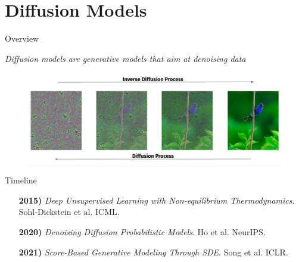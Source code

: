 \documentclass[aspectratio=169, 9pt]{beamer}
\theoremstyle{definition}
\begin{document}
\section{Diffusion Models}
\begin{frame}{Overview}
  \begin{center}
    \it
    Diffusion models are generative models that aim at denoising data
  \end{center}
  \begin{figure}[h!]
    \centering
    \includegraphics[scale=0.2]{./pic/diffusion_intro.png}
  \end{figure}
\end{frame}
\begin{frame}{Timeline}
\begin{enumerate}
  \item[\bf 2015)] \textit{Deep Unsupervised Learning with Non-equilibrium
  Thermodynamics}. Sohl-Dickstein et al. ICML.\vfill
  \item[\bf 2020)] \textit{Denoising Diffusion Probabilistic Models}.
  Ho et al. NeurIPS.\vfill
  \item[\bf 2021)] \textit{Score-Based Generative Modeling Through SDE}. Song et
    al. ICLR.
\end{enumerate}
\end{frame}
\end{document}
